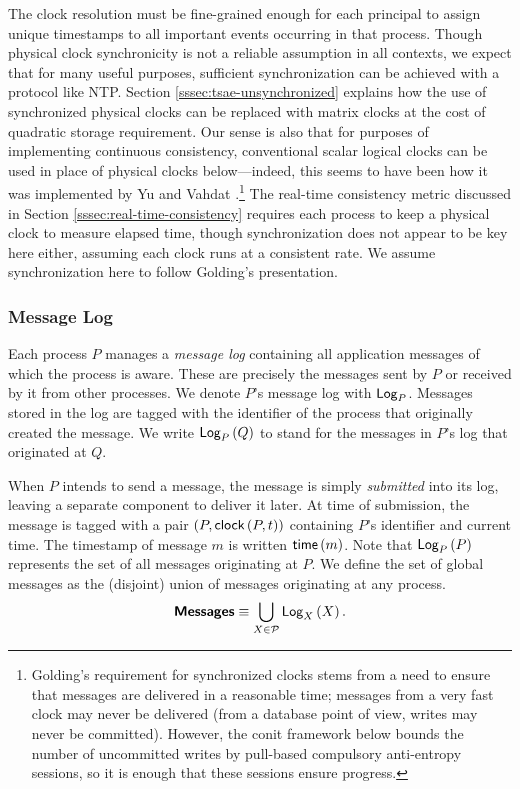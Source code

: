 \documentclass[]             %
{NASA}                       %
\theoremstyle{definition}
\begin{document}
The clock resolution must be fine-grained enough for each principal to
assign unique timestamps to all important events occurring in that
process. Though physical clock synchronicity is not a reliable
assumption in all contexts, we expect that for many useful purposes,
sufficient synchronization can be achieved with a protocol like NTP.
Section \ref{sssec:tsae-unsynchronized} explains how the use of
synchronized physical clocks can be replaced with matrix clocks at the
cost of quadratic storage requirement. Our sense is also that for
purposes of implementing continuous consistency, conventional scalar
logical clocks can be used in place of physical clocks below---indeed,
this seems to have been how it was implemented by Yu and Vahdat
\cite{2000tact}.\footnote{Golding's requirement for synchronized
  clocks stems from a need to ensure that messages are delivered in a
  reasonable time; messages from a very fast clock may never be
  delivered (from a database point of view, writes may never be
  committed). However, the conit framework below bounds the number of
  uncommitted writes by pull-based compulsory anti-entropy sessions,
  so it is enough that these sessions ensure progress.} The real-time
consistency metric discussed in Section
\ref{sssec:real-time-consistency} requires each process to keep a
physical clock to measure elapsed time, though synchronization does
not appear to be key here either, assuming each clock runs at a
consistent rate. We assume synchronization here to follow Golding's
presentation.


\subsubsection{Message Log}
\label{sssec:tsae-message-log}

Each process $P$ manages a \emph{message log} containing all
application messages of which the process is aware. These are
precisely the messages sent by $P$ or received by it from other
processes. We denote $P$'s message log with $\textsf{Log}_{P}$. Messages stored
in the log are tagged with the identifier of the process that
originally created the message. We write $\textsf{Log}_{P}\left(Q\right)$ to stand for
the messages in $P$'s log that originated at $Q$.

When $P$ intends to send a message, the message is simply
\emph{submitted} into its log, leaving a separate component to deliver
it later. At time of submission, the message is tagged with a pair
$(P, \textsf{clock}\left(P,t\right))$ containing $P$'s identifier and current time. The
timestamp of message $m$ is written $\mathsf{time}\left(m\right)$. Note that
$\textsf{Log}_{P}\left(P\right)$ represents the set of all messages originating at
$P$. We define the set of global messages as the (disjoint) union of
messages originating at any process.
\[\textbf{\textsf{Messages}} \equiv \bigcup_{X \in \mathcal{P}} \textsf{Log}_{X}\left(X\right).\]
\end{document}

